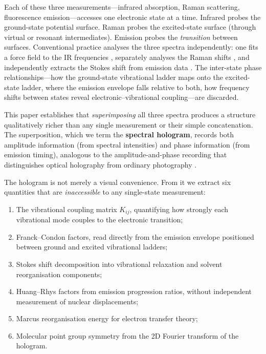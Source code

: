 \documentclass[11pt,twocolumn,a4paper]{article}
\theoremstyle{definition}
\theoremstyle{remark}
\begin{document}
Each of these three measurements---infrared absorption, Raman scattering, fluorescence emission---accesses one electronic state at a time. Infrared probes the ground-state potential surface. Raman probes the excited-state surface (through virtual or resonant intermediates). Emission probes the \emph{transition} between surfaces. Conventional practice analyses the three spectra independently: one fits a force field to the IR frequencies \citep{wilson1955}, separately analyses the Raman shifts \citep{albrecht1961}, and independently extracts the Stokes shift from emission data \citep{stokes1852}. The inter-state phase relationships---how the ground-state vibrational ladder maps onto the excited-state ladder, where the emission envelope falls relative to both, how frequency shifts between states reveal electronic--vibrational coupling---are discarded.

This paper establishes that \emph{superimposing} all three spectra produces a structure qualitatively richer than any single measurement or their simple concatenation. The superposition, which we term the \textbf{spectral hologram}, records both amplitude information (from spectral intensities) and phase information (from emission timing), analogous to the amplitude-and-phase recording that distinguishes optical holography from ordinary photography \citep{bornwolf1999}.

The hologram is not merely a visual convenience. From it we extract six quantities that are \emph{inaccessible} to any single-state measurement:
\begin{enumerate}[label=(\roman*)]
  \item The vibrational coupling matrix $K_{ij}$, quantifying how strongly each vibrational mode couples to the electronic transition;
  \item Franck--Condon factors, read directly from the emission envelope positioned between ground and excited vibrational ladders;
  \item Stokes shift decomposition into vibrational relaxation and solvent reorganisation components;
  \item Huang--Rhys factors from emission progression ratios, without independent measurement of nuclear displacements;
  \item Marcus reorganisation energy for electron transfer theory;
  \item Molecular point group symmetry from the 2D Fourier transform of the hologram.
\end{enumerate}
\end{document}
